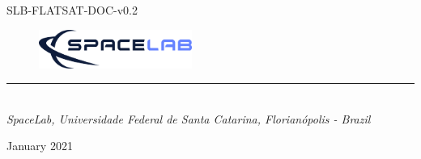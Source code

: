 %
%
%
%
%

%
%
%
%
%
%

\begin{titlepage}

\thispagestyle{empty}

\begin{flushleft}
SLB-FLATSAT-DOC-v0.2
\end{flushleft}

\begin{figure}[!ht]
    \begin{flushleft}
        \includegraphics[width=5cm]{figures/spacelab_logo_full_color_rgb_1000px_72ppi.png}
    \end{flushleft}
\end{figure}

\begin{flushleft}
\Huge{\textbf{\thetitle}}
\rule[0pt]{\textwidth}{5pt}
\end{flushleft}

\vspace{0.2cm}

\begin{flushleft}
\textit{\thetitle} \\
\textit{SpaceLab, Universidade Federal de Santa Catarina, Florianópolis - Brazil}
\end{flushleft}

\vfill
\vfill

\begin{flushright}
January 2021
\end{flushright}

\end{titlepage}
